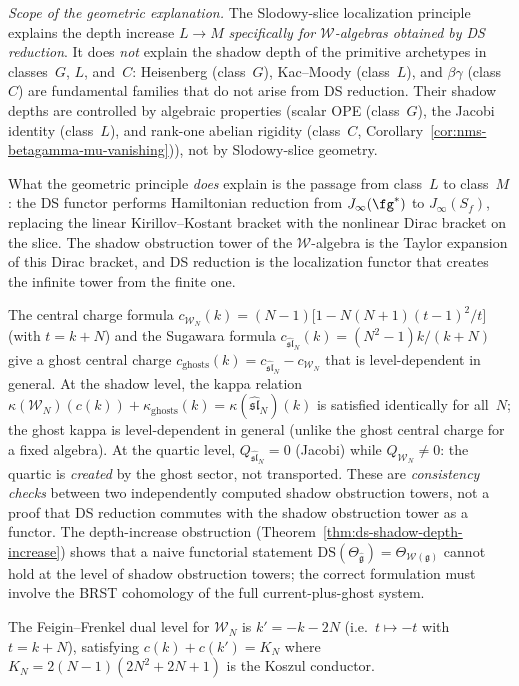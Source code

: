\begin{remark}
\emph{Scope of the geometric explanation.}
The Slodowy-slice localization principle explains the depth
increase $L \to M$ \emph{specifically for $\mathcal{W}$-algebras
obtained by DS reduction}. It does \emph{not} explain the shadow
depth of the primitive archetypes in classes~$G$, $L$, and~$C$:
Heisenberg (class~$G$), Kac--Moody (class~$L$), and
$\beta\gamma$ (class~$C$) are fundamental families that do not
arise from DS reduction. Their shadow depths are controlled by
algebraic properties (scalar OPE (class~$G$), the Jacobi
identity (class~$L$), and rank-one abelian rigidity (class~$C$,
Corollary~\ref{cor:nms-betagamma-mu-vanishing})), not by
Slodowy-slice geometry.

What the geometric principle \emph{does} explain is the
passage from class~$L$ to class~$M$: the DS functor
performs Hamiltonian reduction from $J_\infty(\fg^*)$ to
$J_\infty(S_f)$, replacing the linear Kirillov--Kostant bracket
with the nonlinear Dirac bracket on the slice. The shadow obstruction tower
of the $\mathcal{W}$-algebra is the Taylor expansion of this
Dirac bracket, and DS reduction is the localization functor that
creates the infinite tower from the finite one.
\end{remark}

\begin{remark}
\label{rem:ds-ghost-shadow-consistency}
The central charge formula
$c_{\mathcal{W}_N}(k) = (N{-}1)\bigl[1 - N(N{+}1)(t{-}1)^2/t\bigr]$
(with $t = k{+}N$) and the Sugawara formula
$c_{\hat{\mathfrak{sl}}_N}(k) = (N^2{-}1)k/(k{+}N)$
give a ghost central charge
$c_{\mathrm{ghosts}}(k) = c_{\hat{\mathfrak{sl}}_N} - c_{\mathcal{W}_N}$
that is level-dependent in general.
At the shadow level, the kappa relation
$\kappa(\mathcal{W}_N)(c(k)) + \kappa_{\mathrm{ghosts}}(k) = \kappa(\hat{\mathfrak{sl}}_N)(k)$
is satisfied identically for all~$N$;
the ghost kappa is level-dependent in general (unlike the ghost
central charge for a fixed algebra).
At the quartic level, $Q_{\hat{\mathfrak{sl}}_N} = 0$ (Jacobi)
while $Q_{\mathcal{W}_N} \neq 0$: the quartic is \emph{created}
by the ghost sector, not transported.
These are \emph{consistency checks}
between two independently computed shadow obstruction towers, not a proof
that DS reduction commutes with the shadow obstruction tower as a functor.
The depth-increase obstruction (Theorem~\ref{thm:ds-shadow-depth-increase})
shows that a naive functorial statement $\mathrm{DS}(\Theta_{\hat{\mathfrak{g}}})
= \Theta_{\mathcal{W}(\mathfrak{g})}$ cannot hold at the level of
shadow obstruction towers; the correct formulation must involve the BRST cohomology
of the full current-plus-ghost system.

The Feigin--Frenkel dual level for $\mathcal{W}_N$
is $k' = -k - 2N$ (i.e.\ $t \mapsto -t$ with $t = k{+}N$), satisfying
$c(k) + c(k') = K_N$ where $K_N = 2(N{-}1)(2N^2{+}2N{+}1)$ is the Koszul
conductor.
\end{remark}

